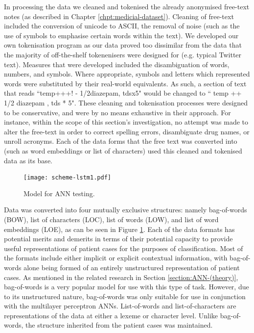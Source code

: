 In processing the data we cleaned and tokenised the already anonymised free-text notes (as described in Chapter \ref{chpt:medicial-dataset}).  Cleaning of free-text included the conversion of unicode to ASCII, the removal of noise (such as the use of symbols to emphasise certain words within the text). We developed our own tokenisation program as our data proved too dissimilar from the data that the majority of off-the-shelf tokenenisers were designed for (e.g. typical Twitter text). Measures that were developed included the disambiguation of words, numbers, and symbols. Where appropriate, symbols and letters which represented words were substituted by their real-world equivalents. As such, a section of text that reads ``temp+++! - 1/2diazepam, tdsx5" would be changed to `` temp ++ 1/2 diazepam , tds * 5". These cleaning and tokenisation processes were designed to be conservative, and were by no means exhaustive in their approach. For instance, within the scope of this section's investigation, no attempt was made to alter the free-text in order to correct spelling errors, disambiguate drug names, or unroll acronyms. Each of the data forms that the free text was converted into (such as word embeddings or list of characters) used this cleaned and tokenised data as its base.

\begin{figure}[htbp]
   \begin{center}

 \texttt{[image: scheme-lstm1.pdf]} 

 \caption{Model for ANN testing.}
 \label{fig:ANN-model}
  \end{center}
\end{figure}
 
Data was converted into four mutually exclusive structures: namely bag-of-words (BOW), list of characters (LOC), list of words (LOW), and list of word embeddings (LOE), as can be seen in Figure \ref{fig:ANN-model}. Each of the data formats has potential merits and demerits in terms of their potential capacity to provide useful representations of patient cases for the purposes of classification. Most of the formats include either implicit or explicit contextual information, with bag-of-words alone being formed of an entirely unstructured representation of patient cases. As mentioned in the related research in Section \ref{section:ANN-(theory)}, bag-of-words is a very popular model for use with this type of task. However, due to its unstructured nature, bag-of-words was only suitable for use in conjunction with the multilayer perceptron ANNs. List-of-words and list-of-characters are representations of the data at either a lexeme or character level. Unlike bag-of-words, the structure inherited from the patient cases was maintained. 

